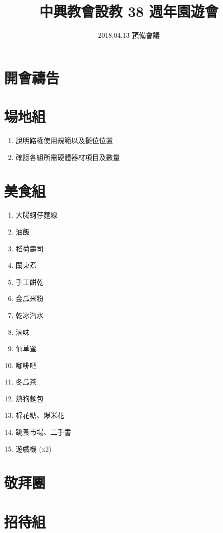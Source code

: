\documentclass[a4paper, 12pt]{article}
\begin{document}
\begin{CJK}{UTF8}{bkai}

\title{中興教會設教 38 週年園遊會}
\author{2018.04.13 預備會議}
\date{}
\maketitle


\section{開會禱告}

\section{場地組}
\begin{enumerate}
  \item 說明路權使用規範以及攤位位置
  \item 確認各組所需硬體器材項目及數量
\end{enumerate}


\section{美食組}
\begin{enumerate}
  \item 大腸蚵仔麵線
  \item 油飯
  \item 稻荷壽司
  \item 關東煮
  \item 手工餅乾
  \item 金瓜米粉
  \item 乾冰汽水
  \item 滷味
  \item 仙草蜜
  \item 咖啡吧
  \item 冬瓜茶
  \item 熱狗麵包
  \item 棉花糖、爆米花
  \item 跳蚤市場、二手書
  \item 遊戲機 (x2)
\end{enumerate}

\section{敬拜團}

\section{招待組}


\end{CJK}
\end{document}
